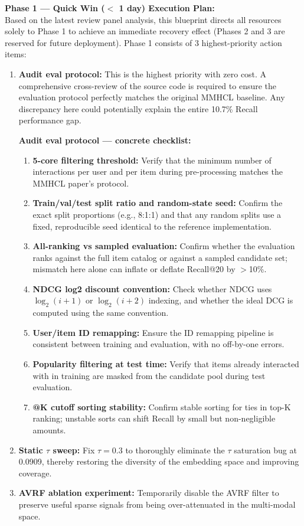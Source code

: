 \documentclass[12pt, a4paper]{article}
\begin{document}
\noindent \textbf{Phase 1 --- Quick Win ($<$ 1 day) Execution Plan:} \\
Based on the latest review panel analysis, this blueprint directs all resources solely to Phase 1 to achieve an immediate recovery effect (Phases 2 and 3 are reserved for future deployment). Phase 1 consists of 3 highest-priority action items:
\begin{enumerate}
\item \textbf{Audit eval protocol:} This is the highest priority with zero cost. A comprehensive cross-review of the source code is required to ensure the evaluation protocol perfectly matches the original MMHCL baseline. Any discrepancy here could potentially explain the entire 10.7\% Recall performance gap.

\begin{mdframed}[backgroundcolor=backcolour, linecolor=codegray, linewidth=0.5pt]
\textbf{Audit eval protocol --- concrete checklist:}
\begin{enumerate}[label=(\roman*), leftmargin=*]
    \item \textbf{5-core filtering threshold:} Verify that the minimum number of interactions per user and per item during pre-processing matches the MMHCL paper's protocol.
    \item \textbf{Train/val/test split ratio and random-state seed:} Confirm the exact split proportions (e.g., 8:1:1) and that any random splits use a fixed, reproducible seed identical to the reference implementation.
    \item \textbf{All-ranking vs sampled evaluation:} Confirm whether the evaluation ranks against the full item catalog or against a sampled candidate set; mismatch here alone can inflate or deflate Recall@20 by $>$10\%.
    \item \textbf{NDCG log2 discount convention:} Check whether NDCG uses $\log_2(i+1)$ or $\log_2(i+2)$ indexing, and whether the ideal DCG is computed using the same convention.
    \item \textbf{User/item ID remapping:} Ensure the ID remapping pipeline is consistent between training and evaluation, with no off-by-one errors.
    \item \textbf{Popularity filtering at test time:} Verify that items already interacted with in training are masked from the candidate pool during test evaluation.
    \item \textbf{@K cutoff sorting stability:} Confirm stable sorting for ties in top-K ranking; unstable sorts can shift Recall by small but non-negligible amounts.
\end{enumerate}
\end{mdframed}

\item \textbf{Static $\tau$ sweep:} Fix $\tau = 0.3$ to thoroughly eliminate the $\tau$ saturation bug at 0.0909, thereby restoring the diversity of the embedding space and improving coverage.
\item \textbf{AVRF ablation experiment:} Temporarily disable the AVRF filter to preserve useful sparse signals from being over-attenuated in the multi-modal space.
\end{enumerate}
\end{document}
